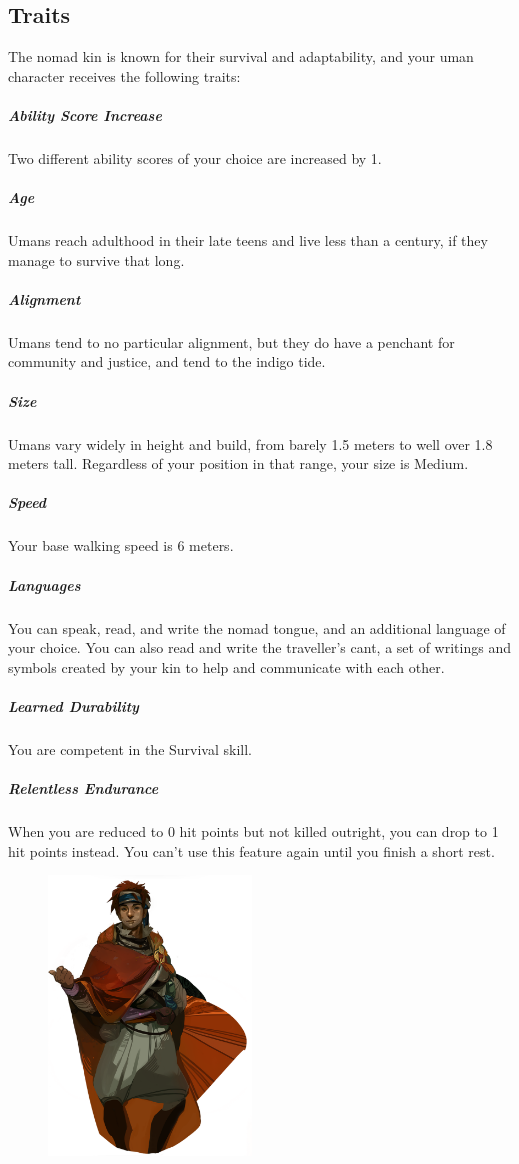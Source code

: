 \subsection*{Traits}
    The nomad kin is known for their survival and adaptability, and your uman character receives the following traits:

    \subparagraph{Ability Score Increase} Two different ability scores of your choice are increased by 1.

    \subparagraph{Age} Umans reach adulthood in their late teens and live less than a century, if they manage to survive that long.

    \subparagraph{Alignment} Umans tend to no particular alignment, but they do have a penchant for community and justice, and tend to the indigo tide.

    \subparagraph{Size} Umans vary widely in height and build, from barely 1.5 meters to well over 1.8 meters tall.
    Regardless of your position in that range, your size is Medium.

    \subparagraph{Speed} Your base walking speed is 6 meters.

    \subparagraph{Languages} You can speak, read, and write the nomad tongue, and an additional language of your choice.
    You can also read and write the traveller's cant, a set of writings and symbols created by your kin to help and communicate with each other.

    \subparagraph{Learned Durability} You are competent in the Survival skill.

    \subparagraph{Relentless Endurance} When you are reduced to 0 hit points but not killed outright, you can drop to 1 hit points instead.
    You can't use this feature again until you finish a short rest.

\begin{figure}[!t]
    \centering
    \includegraphics[width=0.48\textwidth]{04kins/img/19uman_nomad.png}
\end{figure}

